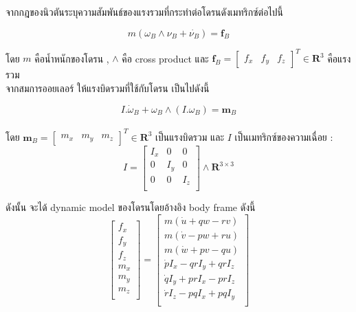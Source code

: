 \documentclass{classes/fiboReport}
\begin{document}
จากกฎของนิวตันระบุความสัมพันธ์ของแรงรวมที่กระทำต่อโดรนดังเมทริกซ์ต่อไปนี้

\begin{equation}
	{ m(\omega_B\wedge \nu_B+\dot{\nu_B})=\mathbf{f}_B}
	\label{equ:total force}
\end{equation}

โดย $m$ คือน้ำหนักของโดรน , $\wedge$ คือ cross product และ $\mathbf{f}_B=\begin{bmatrix}f_x & f_y & f_z \end{bmatrix}^T \in \mathbf{R}^3$ 
คือแรงรวม
\\ จากสมการออยเลอร์ ให้แรงบิดรวมที่ใช้กับโดรน เป็นไปดังนี้

\begin{equation}
	{
		I.\dot{\omega}_B+\omega_B\wedge(I.\omega_B)=\mathbf{m}_B
	}
	\label{equ:total force}
\end{equation}
\\
โดย $\mathbf{m}_B=\begin{bmatrix}m_x & m_y & m_z\end{bmatrix}^T \in \mathbf{R}^3$ เป็นแรงบิดรวม และ $I$ เป็นเมทริกซ์ของความเฉื่อย :
\begin{equation}
	{
		I = \begin{bmatrix}I_x & 0 & 0 \\
		0   & I_y & 0 \\
		0   & 0 & I_z \\
		\end{bmatrix} \wedge \mathbf{R}^{3\times3}
	}
	\label{equ:inertia matrix}
\end{equation}

ดังนั้น จะได้ dynamic model ของโดรนโดยอ้างอิง body frame ดังนี้
\begin{equation}
	{
		\begin{bmatrix}	f_x \\
			f_y \\
			f_z \\
			m_x \\
			m_y \\
			m_z \\   
		\end{bmatrix} = 
		\begin{bmatrix}	m(\dot{u}+qw-rv) \\
			m(\dot{v}-pw+ru)       \\
			m(\dot{w}+pv-qu)       \\
			\dot{p}I_x-qrI_y+qrI_z \\
			\dot{q}I_y+prI_x-prI_z \\
			\dot{r}I_z-pqI_x+pqI_y \\   
		\end{bmatrix}
	}
	\label{equ:dynamic model}
\end{equation}
\end{document}
